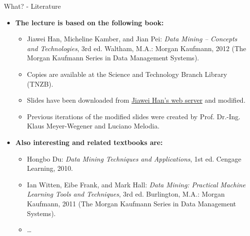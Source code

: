 \begin{frame}{What? - Literature}
	\begin{itemize}
		\item \textbf{The lecture is based on the following book:}
		      \begin{itemize}
			      \item Jiawei Han, Micheline Kamber, and Jian Pei: \emph{Data Mining – Concepts and Technologies}, 3rd ed. Waltham, M.A.: Morgan Kaufmann, 2012 (The Morgan Kaufmann Series in Data Management Systems).
			      \item Copies are available at the Science and Technology Branch Library (TNZB).
			      \item Slides have been downloaded from \href{http://hanj.cs.illinois.edu/}{Jiawei Han's web server} and modified.
			      \item Previous iterations of the modified slides were created by Prof. Dr.-Ing. Klaus Meyer-Wegener and Luciano Melodia.
		      \end{itemize}
		\item \textbf{Also interesting and related textbooks are:}
		      \begin{itemize}
			      \item Hongbo Du: \emph{Data Mining Techniques and Applications}, 1st ed. Cengage Learning, 2010.
			      \item Ian Witten, Eibe Frank, and Mark Hall: \emph{Data Mining: Practical Machine Learning Tools and Techniques}, 3rd ed. Burlington, M.A.: Morgan Kaufmann, 2011 (The Morgan Kaufmann Series in Data Management Systems).
			      \item \ldots
		      \end{itemize}
	\end{itemize}
\end{frame}

